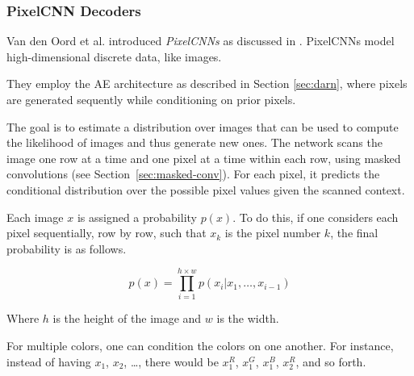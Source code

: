 \subsubsection{PixelCNN Decoders} \label{sec:pixelcnn}

Van den Oord et al. introduced \textit{PixelCNNs} as discussed in \cite{oord_conditional_2016, van_den_oord_pixel_2016}. PixelCNNs model high-dimensional discrete data, like images.

They employ the \ac{AE} architecture as described in Section \ref{sec:darn}, where pixels are generated sequently while conditioning on prior pixels.

The goal is to estimate a distribution over images that can be used to compute the likelihood of images and thus generate new ones. The network scans the image one row at a time and one pixel at a time within each row, using masked convolutions (see Section~\ref{sec:masked-conv}). For each pixel, it predicts the conditional distribution over the possible pixel values given the scanned context.

Each image $x$ is assigned a probability $p(x)$. To do this, if one considers each pixel sequentially, row by row, such that $x_k$ is the pixel number $k$, the final probability is as follows.

\begin{equation}
    p(x) = \prod_{i=1}^{h \times w} p(x_i | x_1, \dots, x_{i-1})
\end{equation}

Where $h$ is the height of the image and $w$ is the width.

For multiple colors, one can condition the colors on one another. For instance, instead of having $x_1$, $x_2$, \dots, there would be $x_1^R$, $x_1^G$, $x_1^B$, $x_2^R$, and so forth.